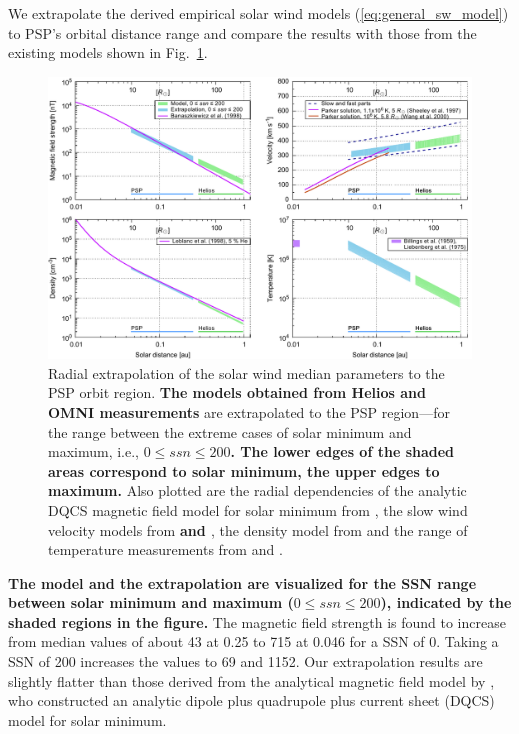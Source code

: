 We extrapolate the derived empirical solar wind models (\ref{eq:general_sw_model}) to PSP’s orbital distance range and compare the results with those from the existing models shown in Fig.~\ref{fig:sw_extrapolation_ssn_e_plot}.
\begin{figure}
	\includegraphics[width=18cm]{figures/sw_extrapolation_ssn_e_plot.pdf}
	\caption{Radial extrapolation of the solar wind median parameters to the PSP orbit region. \textbf{The models obtained from Helios and OMNI measurements} are extrapolated to the PSP region---for the range between the extreme cases of solar minimum and maximum, i.e., $0 \le ssn \le 200$\textbf{. The lower edges of the shaded areas correspond to solar minimum, the upper edges to maximum.} Also plotted are the radial dependencies of the analytic DQCS magnetic field model for solar minimum from \citet{Banaszkiewicz1998}, the slow wind velocity models from \textbf{\citet{Sheeley1997} and \citet{Wang2000}}, the density model from \citet{Leblanc1998} and the range of temperature measurements from \citet{Billings1959} and \citet{Liebenberg1975}.}
	\label{fig:sw_extrapolation_ssn_e_plot}
\end{figure}
\textbf{The model and the extrapolation are visualized for the SSN range between solar minimum and maximum ($0 \le ssn \le 200$), indicated by the shaded regions in the figure.}
The magnetic field strength is found to increase from median values of about \SI{43}{\nT} at \SI{0.25}{\au} to \SI{715}{\nT} at \SI{0.046}{\au} for a SSN of 0. Taking a SSN of 200 increases the values to \SI{69}{\nT} and \SI{1152}{\nT}. Our extrapolation results are slightly flatter than those derived from the analytical magnetic field model by \citet{Banaszkiewicz1998}, who constructed an analytic dipole plus quadrupole plus current sheet (DQCS) model for solar minimum.
